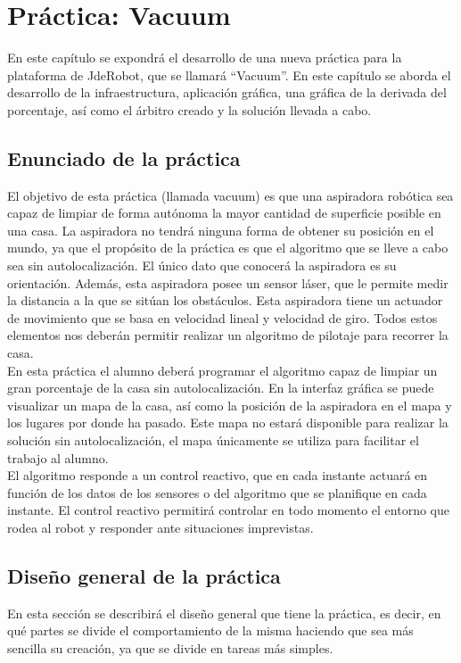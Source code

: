 \chapter{Práctica: Vacuum}\label{cap.roomba}
En este capítulo se expondrá el desarrollo de una nueva práctica para la plataforma de JdeRobot, que se llamará ``Vacuum''. En este capítulo se aborda el desarrollo de la infraestructura, aplicación gráfica, una gráfica de la derivada del porcentaje, así como el árbitro creado y la solución llevada a cabo.\\

\section{Enunciado de la práctica}
El objetivo de esta práctica (llamada vacuum) es que una aspiradora robótica sea capaz de limpiar de forma autónoma la mayor cantidad de superficie posible en una casa. La aspiradora no tendrá ninguna forma de obtener su posición en el mundo, ya que el propósito de la práctica es que el algoritmo que se lleve a cabo sea sin autolocalización. El único dato que conocerá la aspiradora es su orientación.  Además, esta aspiradora posee un sensor láser, que le permite medir la distancia a la que se sitúan los obstáculos. Esta aspiradora tiene un actuador de movimiento que se basa en velocidad lineal y velocidad de giro. Todos estos elementos nos deberán permitir realizar un algoritmo de pilotaje para recorrer la casa.\\

En esta práctica el alumno deberá programar el algoritmo capaz de limpiar un gran porcentaje de la casa sin autolocalización. En la interfaz gráfica se puede visualizar un mapa de la casa, así como la posición de la aspiradora en el mapa y los lugares por donde ha pasado. Este mapa no estará disponible para realizar la solución sin autolocalización, el mapa únicamente se utiliza para facilitar el trabajo al alumno. \\

El algoritmo responde a un control reactivo, que en cada instante actuará en función de los datos de los sensores o del algoritmo que se planifique en cada instante. El control reactivo permitirá controlar en todo momento el entorno que rodea al robot y responder ante situaciones imprevistas.\\

\section{Diseño general de la práctica}
En esta sección se describirá el diseño general que tiene la práctica, es decir, en qué partes se divide el comportamiento de la misma haciendo que sea más sencilla su creación, ya que se divide en tareas más simples.\\

